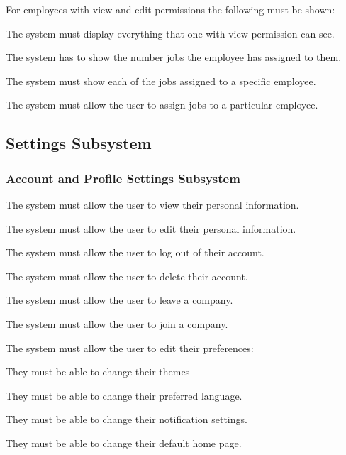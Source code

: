 \documentclass{article}
\begin{document}
\begin{list}{R.}{}
\begin{list}{R.}{}
		\end{list}
		\item For employees with view and edit permissions the following must be shown: 
		\begin{list}{R.}{}
			\item The system must display everything that one with view permission can see.
			\item The system has to show the number jobs the employee has assigned to them.
			\item The system must show each of the jobs assigned to a specific employee.
			\item The system must allow the user to assign jobs to a particular employee.
		\end{list}			
	\end{list}
	
	\subsection*{Settings Subsystem}	
	\subsubsection*{Account and Profile Settings Subsystem}	
	\begin{list}{R.}{}
		\item The system must allow the user to view their personal information. 
		\item The system must allow the user to edit their personal information.
		\item The system must allow the user to log out of their account.
		\item The system must allow the user to delete their account.
		\item The system must allow the user to leave a company.
		\item The system must allow the user to join a company.
		\item The system must allow the user to edit their preferences: 
		\begin{list}{R.}{}
			\item They must be able to change their themes
			\item They must be able to change their preferred language.
			\item They must be able to change their notification settings.
			\item They must be able to change their default home page.
		\end{list}
	\end{list}
\end{document}
